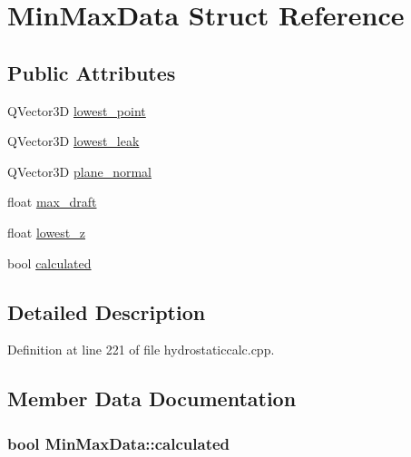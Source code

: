 \hypertarget{structMinMaxData}{\section{Min\-Max\-Data Struct Reference}
\label{structMinMaxData}
}
\subsection*{Public Attributes}
\begin{DoxyCompactItemize}
\item 
Q\-Vector3\-D \hyperlink{structMinMaxData_a3d27ad5adf37db4728e700f914bc2ab3}{lowest\-\_\-point}
\item 
Q\-Vector3\-D \hyperlink{structMinMaxData_ab422a9e59c6bb2bc9a28bbb002d5b09f}{lowest\-\_\-leak}
\item 
Q\-Vector3\-D \hyperlink{structMinMaxData_a62b4b4d97aba034731cdb0f11b23d856}{plane\-\_\-normal}
\item 
float \hyperlink{structMinMaxData_a10cf6d95b5b6d24b6b2e874e9fb05362}{max\-\_\-draft}
\item 
float \hyperlink{structMinMaxData_abe1d706394e9836f49ef8cb5dff7bd99}{lowest\-\_\-z}
\item 
bool \hyperlink{structMinMaxData_aafb5f4af5f4cbcce8f2473b85abf511c}{calculated}
\end{DoxyCompactItemize}


\subsection{Detailed Description}


Definition at line 221 of file hydrostaticcalc.\-cpp.



\subsection{Member Data Documentation}
\hypertarget{structMinMaxData_aafb5f4af5f4cbcce8f2473b85abf511c}{
\subsubsection[{calculated}]{\setlength{\rightskip}{0pt plus 5cm}bool Min\-Max\-Data\-::calculated}}\label{structMinMaxData_aafb5f4af5f4cbcce8f2473b85abf511c}


